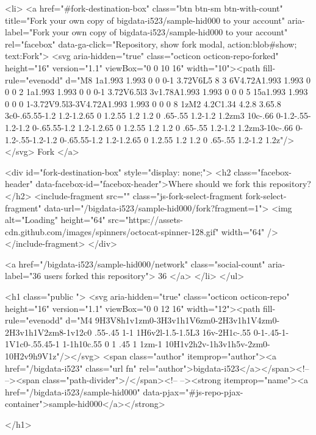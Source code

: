   <li>
          <a href="#fork-destination-box" class="btn btn-sm btn-with-count"
              title="Fork your own copy of bigdata-i523/sample-hid000 to your account"
              aria-label="Fork your own copy of bigdata-i523/sample-hid000 to your account"
              rel="facebox"
              data-ga-click="Repository, show fork modal, action:blob#show; text:Fork">
              <svg aria-hidden="true" class="octicon octicon-repo-forked" height="16" version="1.1" viewBox="0 0 10 16" width="10"><path fill-rule="evenodd" d="M8 1a1.993 1.993 0 0 0-1 3.72V6L5 8 3 6V4.72A1.993 1.993 0 0 0 2 1a1.993 1.993 0 0 0-1 3.72V6.5l3 3v1.78A1.993 1.993 0 0 0 5 15a1.993 1.993 0 0 0 1-3.72V9.5l3-3V4.72A1.993 1.993 0 0 0 8 1zM2 4.2C1.34 4.2.8 3.65.8 3c0-.65.55-1.2 1.2-1.2.65 0 1.2.55 1.2 1.2 0 .65-.55 1.2-1.2 1.2zm3 10c-.66 0-1.2-.55-1.2-1.2 0-.65.55-1.2 1.2-1.2.65 0 1.2.55 1.2 1.2 0 .65-.55 1.2-1.2 1.2zm3-10c-.66 0-1.2-.55-1.2-1.2 0-.65.55-1.2 1.2-1.2.65 0 1.2.55 1.2 1.2 0 .65-.55 1.2-1.2 1.2z"/></svg>
            Fork
          </a>

          <div id="fork-destination-box" style="display: none;">
            <h2 class="facebox-header" data-facebox-id="facebox-header">Where should we fork this repository?</h2>
            <include-fragment src=""
                class="js-fork-select-fragment fork-select-fragment"
                data-url="/bigdata-i523/sample-hid000/fork?fragment=1">
              <img alt="Loading" height="64" src="https://assets-cdn.github.com/images/spinners/octocat-spinner-128.gif" width="64" />
            </include-fragment>
          </div>

    <a href="/bigdata-i523/sample-hid000/network" class="social-count"
       aria-label="36 users forked this repository">
      36
    </a>
  </li>
</ul>

        <h1 class="public ">
  <svg aria-hidden="true" class="octicon octicon-repo" height="16" version="1.1" viewBox="0 0 12 16" width="12"><path fill-rule="evenodd" d="M4 9H3V8h1v1zm0-3H3v1h1V6zm0-2H3v1h1V4zm0-2H3v1h1V2zm8-1v12c0 .55-.45 1-1 1H6v2l-1.5-1.5L3 16v-2H1c-.55 0-1-.45-1-1V1c0-.55.45-1 1-1h10c.55 0 1 .45 1 1zm-1 10H1v2h2v-1h3v1h5v-2zm0-10H2v9h9V1z"/></svg>
  <span class="author" itemprop="author"><a href="/bigdata-i523" class="url fn" rel="author">bigdata-i523</a></span><!--
--><span class="path-divider">/</span><!--
--><strong itemprop="name"><a href="/bigdata-i523/sample-hid000" data-pjax="#js-repo-pjax-container">sample-hid000</a></strong>

</h1>

